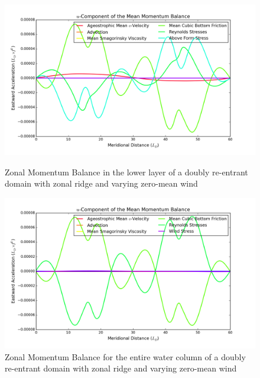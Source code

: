 \documentclass[12pt,a4paper]{report}
\begin{document}
 
 \begin{figure}
 	\centering
 	\begin{minipage}[b]{0.45\linewidth}
 		\centering
 		\includegraphics[width=\linewidth ]{umom_1}
 		\caption{Zonal Momentum Balance in the lower layer of 
 			a doubly re-entrant domain with 
 			zonal ridge and varying zero-mean wind}
 		\label{fig:umomlayer1}
 	\end{minipage}
 	\quad
 	\begin{minipage}[b]{0.45\linewidth}
 		\centering
 		\includegraphics[width=\linewidth ]{umom_4}
 		\caption{Zonal Momentum Balance for the entire water column of 
 			a doubly re-entrant domain with 
 			zonal ridge and varying zero-mean wind}
 		\label{fig:umomtotal}
 	\end{minipage}
 \end{figure}
 
 
 
\end{document}
